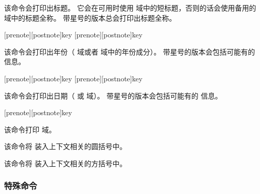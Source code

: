 \begin{ltxsyntax}

该命令会打印出标题。
它会在可用时使用  域中的短标题，否则的话会使用备用的  域中的标题全称。
带星号的版本总会打印出标题全称。

[prenote][postnote]{key}
[prenote][postnote]{key}


该命令会打印出年份（ 域或者  域中的年份成分）。
带星号的版本会包括可能有的  信息。

[prenote][postnote]{key}
[prenote][postnote]{key}


该命令会打印出日期（ 或  域）。
带星号的版本会包括可能有的  信息。

[prenote][postnote]{key}


该命令打印  域。



该命令将  装入上下文相关的圆括号中。



该命令将  装入上下文相关的方括号中。

\end{ltxsyntax}

\subsubsection{特殊命令}%
\label{use:cit:spc}

